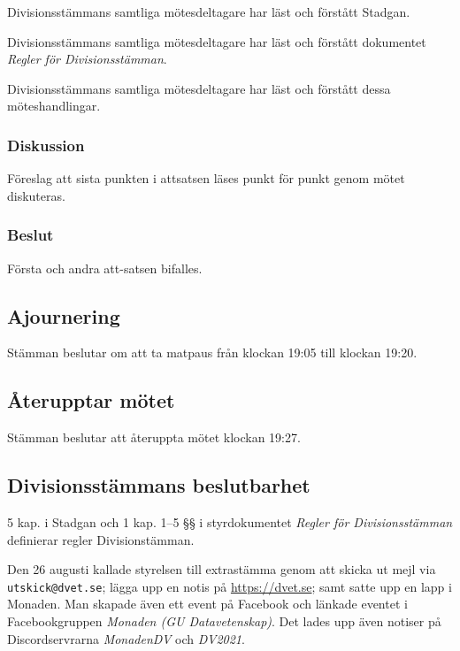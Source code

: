 \documentclass[protokoll]{dvd}
\begin{document}
\begin{attsatser}
	\item Divisionsstämmans samtliga mötesdeltagare har läst och förstått Stadgan.
	\item Divisionsstämmans samtliga mötesdeltagare har läst och förstått dokumentet \emph{Regler för Divisionsstämman}.
	\item Divisionsstämmans samtliga mötesdeltagare har läst och förstått dessa möteshandlingar.
\end{attsatser}

\subsubsection{Diskussion}
Föreslag att sista punkten i attsatsen läses punkt för punkt genom mötet diskuteras.

\subsubsection*{Beslut}

\begin{attsatser}
	\item Första och andra att-satsen bifalles.
\end{attsatser}

\subsection*{Ajournering}
	Stämman beslutar om att ta matpaus från klockan 19:05 till klockan 19:20.
	
\subsection*{Återupptar mötet}
	Stämman beslutar att återuppta mötet klockan 19:27.

\subsection{Divisionsstämmans beslutbarhet}

5 kap. i Stadgan och 1 kap. 1--5 §§ i styrdokumentet \emph{Regler för Divisionsstämman} definierar regler Divisionstämman.

Den 26 augusti kallade styrelsen till extrastämma genom att skicka ut mejl via \verb|utskick@dvet.se|; lägga upp en notis på \url{https://dvet.se}; samt satte upp en lapp i Monaden.
Man skapade även ett event på Facebook och länkade eventet i Facebookgruppen \emph{Monaden (GU Datavetenskap)}.
Det lades upp även notiser på Discordservrarna \emph{MonadenDV} och \emph{DV2021}.
\end{document}
